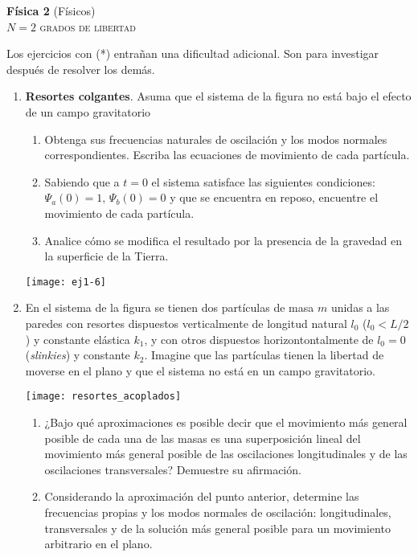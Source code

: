 \documentclass[11pt,spanish,a4paper]{article}
\begin{document}
\begin{center}
	\textbf{Física 2} (Físicos) \hfill {}\\
	\textsc{\LARGE \(N=2\) grados de libertad}
\end{center}


Los ejercicios con (*) entrañan una dificultad adicional. Son para investigar después de resolver los demás.

\begin{enumerate}


\item
\begin{minipage}[t][5cm]{0.75\textwidth}
\textbf{Resortes colgantes}.
Asuma que el sistema de la figura no está bajo el efecto de un campo gravitatorio
\begin{enumerate}
	\item Obtenga sus frecuencias naturales de oscilación y los modos normales correspondientes.
	Escriba las ecuaciones de movimiento de cada partícula.
	\item Sabiendo que a $t= 0$ el sistema satisface las siguientes condiciones: $\Psi_a(0)= 1, \, \Psi_b(0)= 0$ y que se encuentra en reposo, encuentre el movimiento de cada partícula.
	\item Analice cómo se modifica el resultado por la presencia de la gravedad en la superficie de la Tierra.
\end{enumerate}
\end{minipage}
\begin{minipage}[c][0cm][t]{0.2\textwidth}
  \texttt{[image: ej1-6]}
\end{minipage}



\item
\begin{minipage}[t][3cm]{0.6\textwidth}
En el sistema de la figura se tienen dos partículas de masa $m$ unidas a las paredes con resortes dispuestos verticalmente de longitud natural $l_0$ ($l_0< L/2$) y constante elástica $k_1$, y con otros dispuestos horizontontalmente de $l_0= 0$ (\emph{slinkies}) y constante $k_2$.
Imagine que las partículas tienen la libertad de moverse en el plano y que el sistema no está en un campo gravitatorio.
\end{minipage}
\begin{minipage}[c][1cm][t]{0.35\textwidth}
  \texttt{[image: resortes\_acoplados]}
\end{minipage}
\begin{enumerate}
	\item ¿Bajo qué aproximaciones es posible decir que el movimiento más general posible de cada una de las masas es una superposición lineal del movimiento más general posible de las oscilaciones longitudinales y de las oscilaciones transversales?
	Demuestre su afirmación.
	\item Considerando la aproximación del punto anterior, determine las frecuencias propias y los modos normales de oscilación: longitudinales, transversales y de la solución más general posible para un movimiento arbitrario en el plano.
\end{enumerate}




\end{enumerate}
\end{document}
